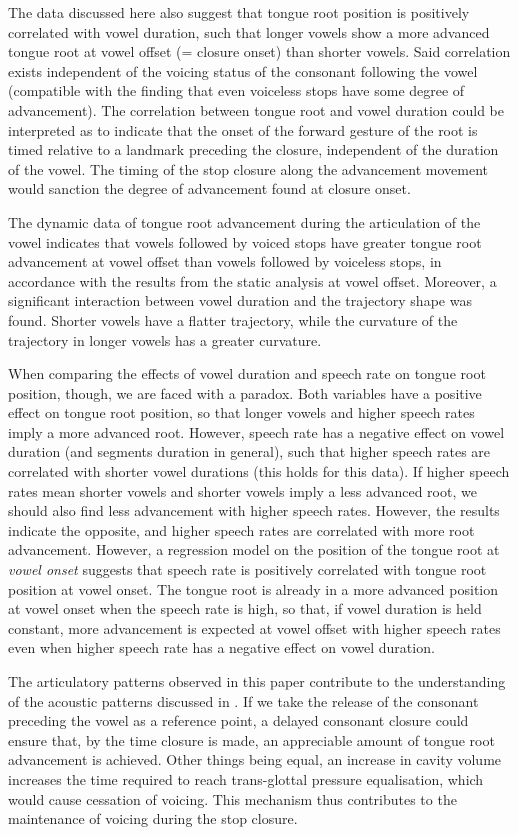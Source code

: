 \documentclass[preprint]{JASAnew}
\begin{document}
The data discussed here also suggest that tongue root position is
positively correlated with vowel duration, such that longer vowels show
a more advanced tongue root at vowel offset (= closure onset) than
shorter vowels. Said correlation exists independent of the voicing
status of the consonant following the vowel (compatible with the finding
that even voiceless stops have some degree of advancement). The
correlation between tongue root and vowel duration could be interpreted
as to indicate that the onset of the forward gesture of the root is
timed relative to a landmark preceding the closure, independent of the
duration of the vowel. The timing of the stop closure along the
advancement movement would sanction the degree of advancement found at
closure onset.

The dynamic data of tongue root advancement during the articulation of
the vowel indicates that vowels followed by voiced stops have greater
tongue root advancement at vowel offset than vowels followed by
voiceless stops, in accordance with the results from the static analysis
at vowel offset. Moreover, a significant interaction between vowel
duration and the trajectory shape was found. Shorter vowels have a
flatter trajectory, while the curvature of the trajectory in longer
vowels has a greater curvature.

When comparing the effects of vowel duration and speech rate on tongue
root position, though, we are faced with a paradox. Both variables have
a positive effect on tongue root position, so that longer vowels and
higher speech rates imply a more advanced root. However, speech rate has
a negative effect on vowel duration (and segments duration in general),
such that higher speech rates are correlated with shorter vowel
durations (this holds for this data). If higher speech rates mean
shorter vowels and shorter vowels imply a less advanced root, we should
also find less advancement with higher speech rates. However, the
results indicate the opposite, and higher speech rates are correlated
with more root advancement. However, a regression model on the position
of the tongue root at \emph{vowel onset} suggests that speech rate is
positively correlated with tongue root position at vowel onset. The
tongue root is already in a more advanced position at vowel onset when
the speech rate is high, so that, if vowel duration is held constant,
more advancement is expected at vowel offset with higher speech rates
even when higher speech rate has a negative effect on vowel duration.

The articulatory patterns observed in this paper contribute to the
understanding of the acoustic patterns discussed in . If
we take the release of the consonant preceding the vowel as a reference
point, a delayed consonant closure could ensure that, by the time
closure is made, an appreciable amount of tongue root advancement is
achieved. Other things being equal, an increase in cavity volume
increases the time required to reach trans-glottal pressure
equalisation, which would cause cessation of voicing. This mechanism
thus contributes to the maintenance of voicing during the stop closure.
\end{document}
